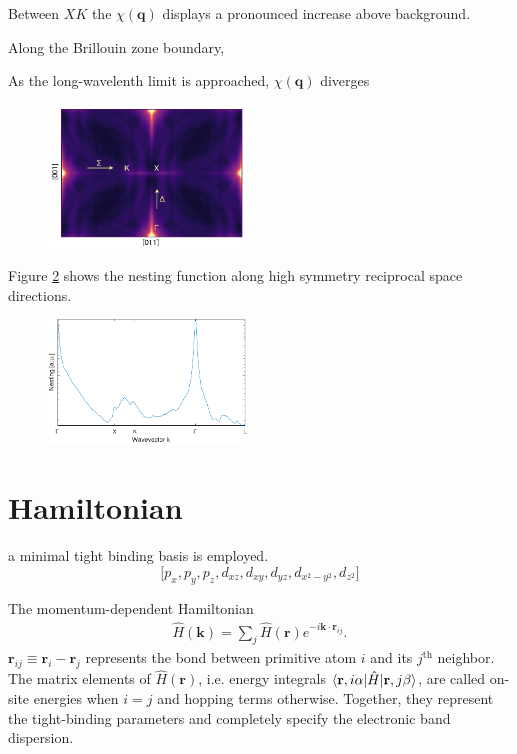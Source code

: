 \documentclass[twocolumn,showpacs,preprintnumbers,superscriptaddress,prb,floatfix,aps,10pt]{revtex4-1}
\renewcommand{\vec}[1]{\ensuremath{\mathbf{#1}}}
\newcommand*{\ham}{\hat{H}}
\newcommand*{\bondvec}{\vec{r}_{ij}}
\newcommand*{\nesting}{\chi(\vec{q})}
\begin{document}
Between $XK$ the $\nesting$ displays a pronounced increase above background. 

Along the Brillouin zone boundary, 

As the long-wavelenth limit is approached, $\nesting$ diverges 


%
\begin{figure}[h]
\includegraphics[width=0.47\textwidth]{Figure_3_nesting_2d.pdf}
\caption[LRC circuit response.]{\label{fig:nesting_2d} }
\end{figure}

Figure \ref{fig:nesting_1d} shows the nesting function along high symmetry reciprocal space directions.
\begin{figure}[h]
\includegraphics[width=0.47\textwidth]{Figure_4_nesting_1d.pdf}
\caption[LRC circuit response.]{\label{fig:nesting_1d} }
\end{figure}






\section{Hamiltonian}

a minimal tight binding basis is employed. 
\begin{equation}
\big[ p_{x}, p_{y}, p_{z}, d_{xz}, d_{xy}, d_{yz}, d_{x^2-y^2}, d_{z^2}	\big]
\end{equation}





The momentum-dependent Hamiltonian
\begin{align}
\label{eq:matrix_element}
\ham(\vec{k}) = \sum_j \ham(\vec{r}) e^{-i \vec{k}\cdot\vec{r}_{ij}} .
\end{align}
%
$\bondvec \equiv \vec{r}_i - \vec{r}_j$ represents the bond between primitive atom $i$ and its $j^{\textrm{th}}$ neighbor. The matrix elements of $\ham(\vec{r})$, i.e. energy integrals $\braket{\vec{r},i\alpha | \ham | \vec{r},j\beta}$, are called on-site energies when $i=j$ and hopping terms otherwise. Together, they represent the tight-binding parameters and completely specify the electronic band dispersion. 
\end{document}
